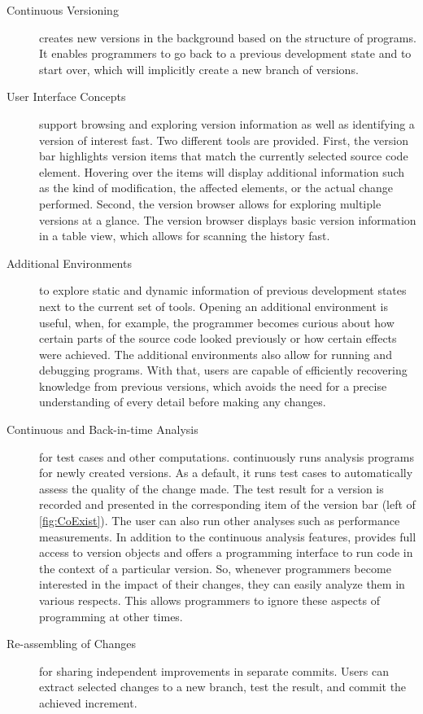 \begin{description}
\item[Continuous Versioning] creates new versions in the background
  based on the structure of programs. It enables programmers to go
  back to a previous development state and to start over, which will
  implicitly create a new branch of versions.
 
\item[User Interface Concepts] support browsing and exploring version
  information as well as identifying a version of interest fast. Two
  different tools are provided. First, the version bar highlights
  version items that match the currently selected source code
  element. Hovering over the items will display additional information such
  as the kind of modification, the affected elements, or the actual
  change performed. Second, the version browser allows for exploring
  multiple versions at a glance. The version browser displays basic
  version information in a table view, which allows for scanning the
  history fast.

\item[Additional Environments] to explore static and dynamic
  information of previous development states next to the current set
  of tools. Opening an additional environment is useful, when, for
  example, the programmer becomes curious about how certain
  parts of the source code looked previously or how certain effects
  were achieved. The additional environments also allow for running
  and debugging programs. With that, users are capable of efficiently
  recovering knowledge from previous versions, which avoids the need
  for a precise understanding of every detail before making any
  changes.

\item[Continuous and Back-in-time Analysis] for test cases and other
  computations. \coexist{} continuously runs analysis programs for
  newly created versions. As a default, it runs test cases to
  automatically assess the quality of the change made. The test result
  for a version is recorded and presented in the corresponding item
  of the version bar (left of \autoref{fig:CoExist}). The user can
  also run other analyses such as performance measurements. In
  addition to the continuous analysis features, \coexist provides full
  access to version objects and offers a programming interface to run
  code in the context of a particular version. So, whenever
  programmers become interested in the impact of their changes, they
  can easily analyze them in various respects. This allows programmers
  to ignore these aspects of programming at other times.

\item[Re-assembling of Changes] for sharing independent improvements
  in separate commits. Users can extract selected changes to a new
  branch, test the result, and commit the achieved increment.
\end{description}

